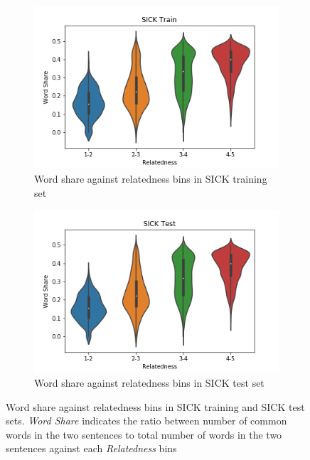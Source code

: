 \begin{enumerate}
\begin{figure}
	\captionsetup[subfigure]{justification=centering}
	\centering
	\begin{subfigure}[b]{.5\textwidth}
		\centering
		\includegraphics[width=\textwidth]{figures/semantic_textual_similarity/introduction/sick_train_word_share.png}
		\caption{Word share against relatedness bins in SICK training set}
		\label{fig:sick_train_word_share}
	\end{subfigure}%
	\begin{subfigure}[b]{.5\textwidth}
		\centering
		\includegraphics[width=\textwidth]{figures/semantic_textual_similarity/introduction/sick_test_word_share.png}
		\caption{Word share against relatedness bins in SICK test set}
		\label{fig:sick_test_word_share}
	\end{subfigure}
	\caption[Word share against relatedness bins in SICK training and SICK test sets.]{Word share against relatedness bins in SICK training and SICK test sets. \textit{Word Share} indicates the ratio between number of common words in the two sentences to total number of words in the two sentences against each \textit{Relatedness} bins}
	\label{fig:sick_word_share}
\end{figure}




\end{enumerate}
